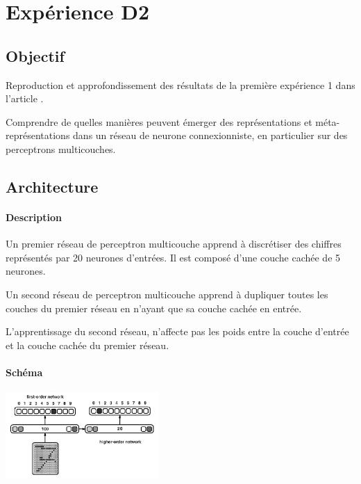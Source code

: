 \section{Expérience D2} 
  \subsection{Objectif}
    Reproduction et approfondissement des résultats de la première expérience 1 dans l'article 
    \cite{Cleeremans_2007}. 

  
  
    Comprendre de quelles manières peuvent émerger des représentations et méta-représentations dans 
    un réseau de neurone connexionniste, en particulier sur des perceptrons multicouches.
  
  
  \subsection{Architecture}
    \paragraph{Description}
      Un premier réseau de perceptron multicouche apprend à discrétiser des chiffres représentés
      par 20 neurones d'entrées. Il est composé d'une couche cachée de 5 neurones.
      
      Un second réseau de perceptron multicouche apprend à dupliquer toutes les couches du premier
      réseau en n'ayant que sa couche cachée en entrée.
      
      L'apprentissage du second réseau, n'affecte pas les poids entre la couche d'entrée et la 
      couche cachée du premier réseau.

    \paragraph{Schéma}
      \begin{center}
	\includegraphics[width=220px]{data/expD2/schema.png}
      \end{center}
      
